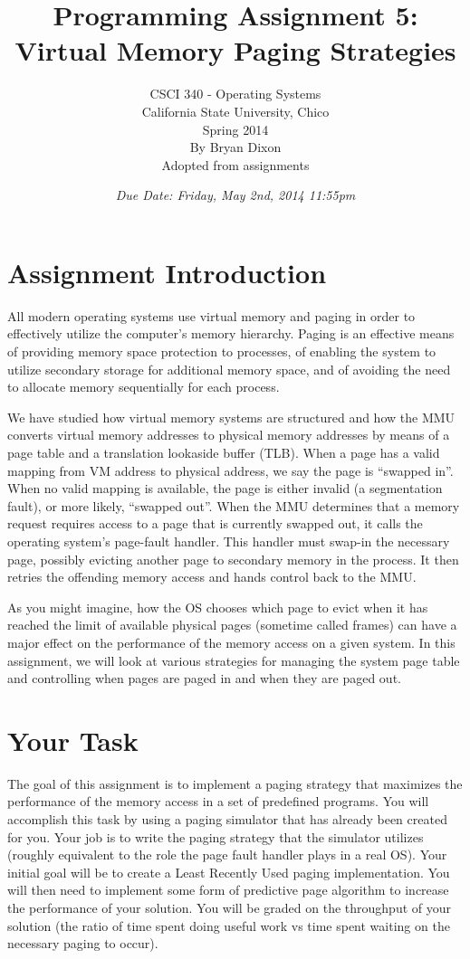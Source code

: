 \documentclass[12pt]{article}
\title{Programming Assignment 5:\\Virtual Memory Paging Strategies}
\author{
  CSCI 340 - Operating Systems\\
  California State University, Chico\\
  Spring 2014\\
  By Bryan Dixon\\
  Adopted from assignments\cite{couch-a5}\cite{asayler}\\ 
}
\date{\emph{Due Date: Friday, May 2nd, 2014 11:55pm}}
\begin{document}
\maketitle

\section{Assignment Introduction}

All modern operating systems use virtual memory and paging in order to
effectively utilize the computer's memory hierarchy. Paging is an
effective means of providing memory space protection to processes, of
enabling the system to utilize secondary storage for additional
memory space, and of avoiding the need to allocate memory sequentially
for each process.

We have studied how virtual memory systems are structured and how the MMU
converts virtual memory addresses to physical memory addresses by
means of a page table and a translation lookaside buffer (TLB). When a
page has a valid mapping from VM address to physical address, we say
the page is ``swapped in''. When no valid mapping is available, the page
is either invalid (a segmentation fault), or more likely, ``swapped
out''. When the MMU determines that a memory request requires access to
a page that is currently swapped out, it calls the operating system's
page-fault handler. This handler must swap-in the necessary page,
possibly evicting another page to secondary memory in the process.
It then retries the
offending memory access and hands control back to the MMU.

As you might imagine, how the OS chooses which page to evict when it
has reached the limit of available physical pages (sometime called
frames) can have a major
effect on the performance of the memory access on a given system.
In this assignment, we will look at various strategies for managing
the system page table and controlling when pages are paged in and when
they are paged out.

\section{Your Task}

The goal of this assignment is to implement a paging strategy that
maximizes the performance of the memory access in a
set of predefined programs. You will accomplish this task by using a
paging simulator that has already been created for you. Your job is to
write the paging strategy that the simulator utilizes (roughly
equivalent to the role the page fault handler plays in a real OS). Your
initial goal will be to create a Least Recently Used paging
implementation. You will then need to implement some form of predictive
page algorithm to increase the performance of your solution.
You will be graded
on the throughput of your solution (the ratio of time spent doing
useful work vs time spent waiting on the necessary paging to occur).
\end{document}
